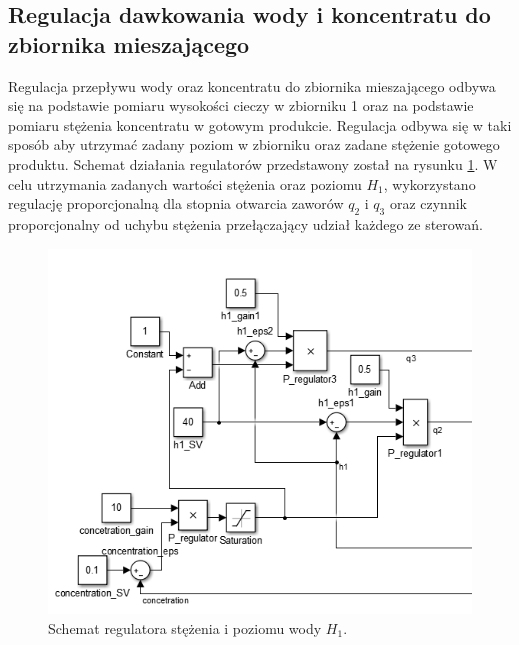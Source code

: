 \subsection{Regulacja dawkowania wody i koncentratu do zbiornika mieszającego}
\indent Regulacja przepływu wody oraz koncentratu do zbiornika mieszającego odbywa się na podstawie pomiaru wysokości cieczy w zbiorniku 1 oraz na podstawie pomiaru stężenia koncentratu w gotowym produkcie. Regulacja odbywa się w taki sposób aby utrzymać zadany poziom w zbiorniku oraz zadane stężenie gotowego produktu. Schemat działania regulatorów przedstawony został na rysunku \ref{fig:h1reg}. W celu utrzymania zadanych wartości stężenia oraz poziomu $H_{1}$, wykorzystano regulację proporcjonalną dla stopnia otwarcia zaworów $q_{2}$ i $q_{3}$ oraz czynnik proporcjonalny od uchybu stężenia przełączający udział każdego ze sterowań.
\begin{figure}[H]
	\centering
	\includegraphics[scale = 0.6]{fig/h1_regulator.png}
	\caption{Schemat regulatora stężenia i poziomu wody $H_{1}$.}
	\label{fig:h1reg}
\end{figure}
